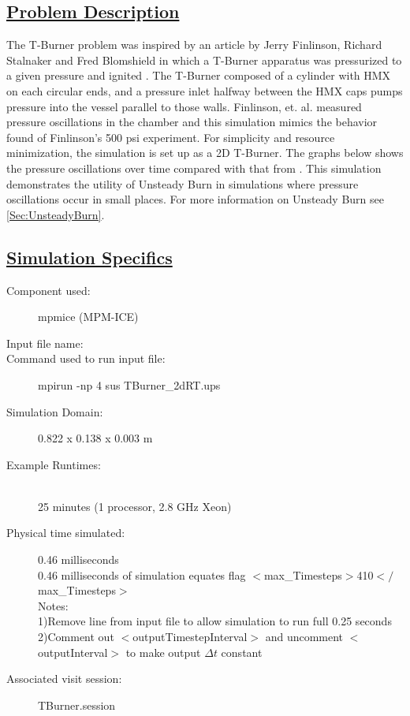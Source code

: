 \subsection*{\underline{Problem Description}}
The T-Burner problem was inspired by  an article by Jerry Finlinson, Richard Stalnaker and Fred Blomshield in which a T-Burner apparatus was pressurized to a given pressure and ignited \cite{ref:finlinson1}.  The T-Burner composed of a cylinder with HMX on each circular ends, and a pressure inlet halfway between the HMX caps pumps pressure into the vessel parallel to those walls.  Finlinson, et. al. measured pressure oscillations in the chamber and this simulation mimics the behavior found of Finlinson's 500 psi experiment.  For simplicity and resource minimization, the simulation is set up as a 2D T-Burner.  The graphs below shows the pressure oscillations over time compared with that from \cite{ref:finlinson1}.  This simulation demonstrates the utility of Unsteady Burn in simulations where pressure oscillations occur in small places.  For more information on Unsteady Burn see \ref{Sec:UnsteadyBurn}.

\subsection*{\underline{Simulation Specifics}}
\begin{description}
\item [Component used:] \hfill mpmice (MPM-ICE)
\item [Input file name:] \hfill {}
\item [Command used to run input file:]\hfill mpirun -np 4 sus TBurner\_2dRT.ups

\item [Simulation Domain:]\hfill    0.822 x 0.138 x 0.003 m

\item [Example Runtimes:] \hfill \\
 25 minutes   (1 processor, 2.8 GHz Xeon)\\

\item [Physical time simulated:] \hfill 0.46 milliseconds \\ 
0.46 milliseconds of simulation equates flag $<$max\_Timesteps$>$410$</$max\_Timesteps$>$ \\ %
Notes: \\
1)Remove line from input file to allow simulation to run full 0.25 seconds \\
2)Comment out $<$outputTimestepInterval$>$ and uncomment $<$outputInterval$>$ to make output $\Delta t$ constant \\ 

\item [Associated visit session:] \hfill TBurner.session

\end{description}

